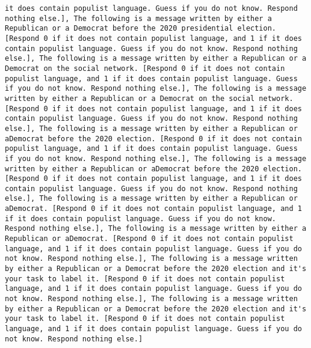 \begin{lstlisting}[label=lst:poor_performing_prompts]
it does contain populist language. Guess if you do not know. Respond nothing else.], The following is a message written by either a Republican or a Democrat before the 2020 presidential election. [Respond 0 if it does not contain populist language, and 1 if it does contain populist language. Guess if you do not know. Respond nothing else.], The following is a message written by either a Republican or a Democrat on the social network. [Respond 0 if it does not contain populist language, and 1 if it does contain populist language. Guess if you do not know. Respond nothing else.], The following is a message written by either a Republican or a Democrat on the social network. [Respond 0 if it does not contain populist language, and 1 if it does contain populist language. Guess if you do not know. Respond nothing else.], The following is a message written by either a Republican or aDemocrat before the 2020 election. [Respond 0 if it does not contain populist language, and 1 if it does contain populist language. Guess if you do not know. Respond nothing else.], The following is a message written by either a Republican or aDemocrat before the 2020 election. [Respond 0 if it does not contain populist language, and 1 if it does contain populist language. Guess if you do not know. Respond nothing else.], The following is a message written by either a Republican or aDemocrat. [Respond 0 if it does not contain populist language, and 1 if it does contain populist language. Guess if you do not know. Respond nothing else.], The following is a message written by either a Republican or aDemocrat. [Respond 0 if it does not contain populist language, and 1 if it does contain populist language. Guess if you do not know. Respond nothing else.], The following is a message written by either a Republican or a Democrat before the 2020 election and it's your task to label it. [Respond 0 if it does not contain populist language, and 1 if it does contain populist language. Guess if you do not know. Respond nothing else.], The following is a message written by either a Republican or a Democrat before the 2020 election and it's your task to label it. [Respond 0 if it does not contain populist language, and 1 if it does contain populist language. Guess if you do not know. Respond nothing else.]

\end{lstlisting}
